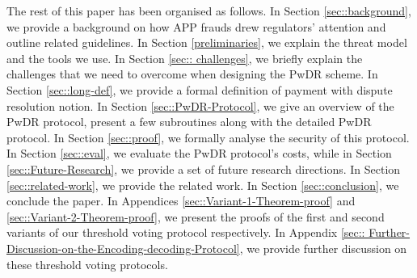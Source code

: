 



The rest of this paper has been organised as follows.  In Section \ref{sec::background}, we provide a background on how  APP frauds drew regulators' attention and outline related guidelines. In Section \ref{preliminaries}, we explain the threat model and the tools we use. In Section \ref{sec:: challenges}, we briefly explain the challenges that  we need to overcome when designing the PwDR scheme.  In Section \ref{sec::long-def}, we provide a formal definition of payment with dispute resolution notion. In Section \ref{sec::PwDR-Protocol}, we give an overview of  the PwDR protocol, present a few subroutines along with the detailed PwDR protocol. In Section \ref{sec::proof}, we formally analyse the security of this protocol. In Section \ref{sec::eval}, we evaluate the PwDR protocol's costs, while in Section \ref{sec::Future-Research}, we provide a set of future research directions. In Section \ref{sec::related-work}, we provide the related work. In Section \ref{sec::conclusion}, we conclude the paper. In Appendices \ref{sec::Variant-1-Theorem-proof} and \ref{sec::Variant-2-Theorem-proof}, we present the proofs of the first and second variants of our threshold voting protocol respectively. In Appendix \ref{sec:: Further-Discussion-on-the-Encoding-decoding-Protocol}, we provide further discussion on these threshold voting protocols. 







